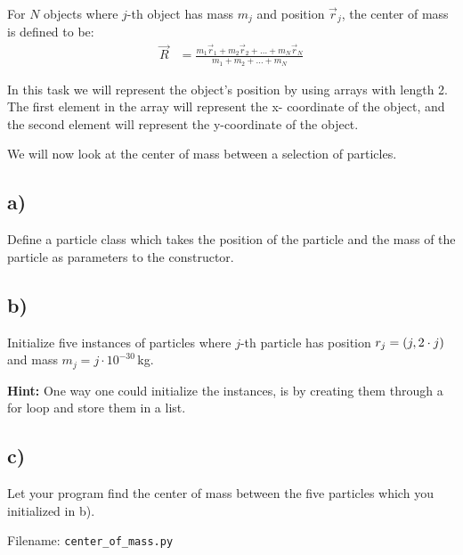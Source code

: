 \documentclass[10pt,a4paper]{article}
\begin{document}
For $N$ objects where $j$-th object has mass $m_j$ and position $\vec{r}_j$, the center of mass is defined to be:
\begin{align*}
\vec{R} &= \frac{m_1\vec{r}_1 + m_2\vec{r}_2 + \dots + m_N\vec{r}_N }{m_1 + m_2 + \dots + m_N} 
\end{align*}

In this task we will represent the object's position by using arrays with length 2. The first element in the array will represent the x- coordinate of the object, and the second element will represent the y-coordinate of the object. 

We will now look at the center of mass between a selection of particles.
\subsection*{a)}
Define a particle class which takes the position of the particle and the mass of the particle as parameters to the constructor. 
\subsection*{b)}
Initialize five instances of particles where $j$-th particle has position $r_j = \qty(j,2\cdot j)$ and mass $m_j = j\cdot 10^{-30}\,$kg. 

\textbf{Hint: } One way one could initialize the instances, is by creating them through a for loop and store them in a list. 
\subsection*{c)}
Let your program find the center of mass between the five particles which you initialized in b). 

Filename: \texttt{center\_of\_mass.py}
\end{document}
